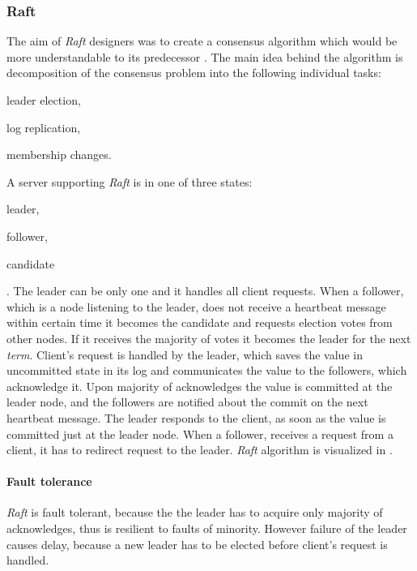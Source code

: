 \subsubsection{Raft}
The aim of \emph{Raft} designers was to create a consensus algorithm which would be more understandable to its predecessor \cite{ongaro2014search}. 
The main idea behind the algorithm is decomposition of the consensus problem into the following individual tasks:
\begin{enumerate*}[label=\alph*)]
\item leader election,
\item log replication,
\item membership changes.
\end{enumerate*} 
 
 A server supporting \emph{Raft} is in one of three states: \begin{enumerate*}[label=\alph*)] \item leader, \item follower, \item candidate \end{enumerate*}. The leader can be only one and it handles all client requests.
  When a follower, which is a node listening to the leader, does not receive a heartbeat message within certain time it becomes the candidate and requests election votes from other nodes. If it receives the majority of votes it becomes the leader for the next \emph{term}. Client's request is handled by the leader, which saves the value in uncommitted state in its log and communicates the value to the followers, which acknowledge it. Upon majority of acknowledges the value is committed at the leader node, and the followers are notified about the commit on the next heartbeat message. The leader responds to the client, as soon as the value is committed just at the leader node. When a follower, receives a request from a client, it has to redirect request to the leader. \emph{Raft} algorithm is visualized in \cite{raftVisual}.

\paragraph{Fault tolerance} \emph{Raft} is fault tolerant, because the the leader has to acquire only majority of acknowledges, thus is resilient to faults of minority. However failure of the leader causes delay, because a new leader has to be elected before client's request is handled.

